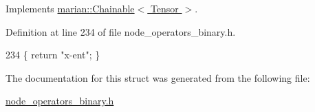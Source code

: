 Implements \hyperlink{classmarian_1_1Chainable_a2b7a5cbdac7a7d3bd7d781a6ff148fc3}{marian\+::\+Chainable$<$ Tensor $>$}.



Definition at line 234 of file node\+\_\+operators\+\_\+binary.\+h.


\begin{DoxyCode}
234 \{ \textcolor{keywordflow}{return} \textcolor{stringliteral}{"x-ent"}; \}
\end{DoxyCode}


The documentation for this struct was generated from the following file\+:\begin{DoxyCompactItemize}
\item 
\hyperlink{node__operators__binary_8h}{node\+\_\+operators\+\_\+binary.\+h}\end{DoxyCompactItemize}
